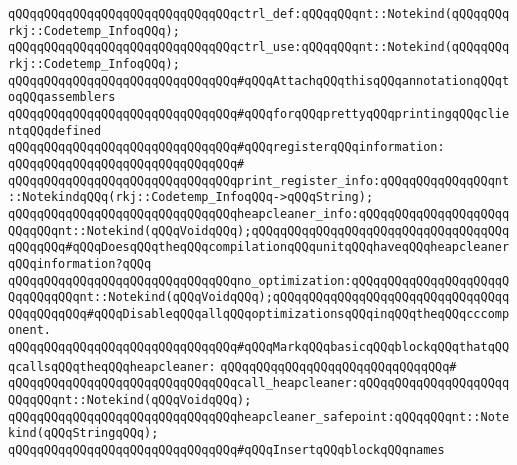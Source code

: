 \newline
\verb|qQQqqQQqqQQqqQQqqQQqqQQqqQQqqQQqctrl_def:qQQqqQQqnt::Notekind(qQQqqQQqrkj::Codetemp_InfoqQQq);|\newline
\verb|qQQqqQQqqQQqqQQqqQQqqQQqqQQqqQQqctrl_use:qQQqqQQqnt::Notekind(qQQqqQQqrkj::Codetemp_InfoqQQq);|\newline
\newline
\newline
\verb|qQQqqQQqqQQqqQQqqQQqqQQqqQQqqQQq#qQQqAttachqQQqthisqQQqannotationqQQqtoqQQqassemblers|\newline
\verb|qQQqqQQqqQQqqQQqqQQqqQQqqQQqqQQq#qQQqforqQQqprettyqQQqprintingqQQqclientqQQqdefined|\newline
\verb|qQQqqQQqqQQqqQQqqQQqqQQqqQQqqQQq#qQQqregisterqQQqinformation:|\newline
\verb|qQQqqQQqqQQqqQQqqQQqqQQqqQQqqQQq#|\newline
\verb|qQQqqQQqqQQqqQQqqQQqqQQqqQQqqQQqprint_register_info:qQQqqQQqqQQqqQQqnt::NotekindqQQq(rkj::Codetemp_InfoqQQq->qQQqString);|\newline
\newline
\verb|qQQqqQQqqQQqqQQqqQQqqQQqqQQqqQQqheapcleaner_info:qQQqqQQqqQQqqQQqqQQqqQQqqQQqnt::Notekind(qQQqVoidqQQq);qQQqqQQqqQQqqQQqqQQqqQQqqQQqqQQqqQQqqQQqqQQq#qQQqDoesqQQqtheqQQqcompilationqQQqunitqQQqhaveqQQqheapcleanerqQQqinformation?qQQq|\newline
\newline
\newline
\verb|qQQqqQQqqQQqqQQqqQQqqQQqqQQqqQQqno_optimization:qQQqqQQqqQQqqQQqqQQqqQQqqQQqqQQqnt::Notekind(qQQqVoidqQQq);qQQqqQQqqQQqqQQqqQQqqQQqqQQqqQQqqQQqqQQqqQQq#qQQqDisableqQQqallqQQqoptimizationsqQQqinqQQqtheqQQqcccomponent.|\newline
\newline
\newline
\verb|qQQqqQQqqQQqqQQqqQQqqQQqqQQqqQQq#qQQqMarkqQQqbasicqQQqblockqQQqthatqQQqcallsqQQqtheqQQqheapcleaner:|\newline
\verb|qQQqqQQqqQQqqQQqqQQqqQQqqQQqqQQq#|\newline
\verb|qQQqqQQqqQQqqQQqqQQqqQQqqQQqqQQqcall_heapcleaner:qQQqqQQqqQQqqQQqqQQqqQQqqQQqnt::Notekind(qQQqVoidqQQq);|\newline
\verb|qQQqqQQqqQQqqQQqqQQqqQQqqQQqqQQqheapcleaner_safepoint:qQQqqQQqnt::Notekind(qQQqStringqQQq);|\newline
\newline
\newline
\verb|qQQqqQQqqQQqqQQqqQQqqQQqqQQqqQQq#qQQqInsertqQQqblockqQQqnames|\newline

